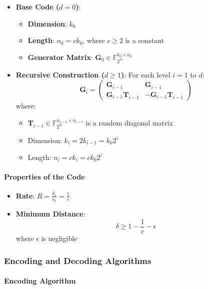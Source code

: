 \documentclass{article}
\theoremstyle{plain}
\theoremstyle{definition}
\theoremstyle{remark}
\theoremstyle{problem}
\begin{document}
\begin{itemize}
    \item \textbf{Base Code ($d = 0$)}:
    \begin{itemize}
        \item \textbf{Dimension}: $k_0$
        \item \textbf{Length}: $n_0 = c k_0$, where $c \geq 2$ is a constant
        \item \textbf{Generator Matrix}: $\mathbf{G}_0 \in \mathbb{F}_{2^m}^{k_0 \times n_0}$
    \end{itemize}

    \item \textbf{Recursive Construction ($d \geq 1$)}:
    For each level $i = 1$ to $d$:
    \[
    \mathbf{G}_i = \begin{pmatrix}
    \mathbf{G}_{i-1} & \mathbf{G}_{i-1} \\
    \mathbf{G}_{i-1} \mathbf{T}_{i-1} & -\mathbf{G}_{i-1} \mathbf{T}_{i-1}
    \end{pmatrix}
    \]
    where:
    \begin{itemize}
        \item $\mathbf{T}_{i-1} \in \mathbb{F}_{2^m}^{n_{i-1} \times n_{i-1}}$ is a random diagonal matrix
        \item Dimension: $k_i = 2 k_{i-1} = k_0 2^i$
        \item Length: $n_i = c k_i = c k_0 2^i$
    \end{itemize}
\end{itemize}

\paragraph{Properties of the Code}

\begin{itemize}
    \item \textbf{Rate}: $R = \frac{k_i}{n_i} = \frac{1}{c}$
    \item \textbf{Minimum Distance}:
    \[
    \delta \geq 1 - \frac{1}{c} - \epsilon
    \]
    where $\epsilon$ is negligible
\end{itemize}

\subsubsection{Encoding and Decoding Algorithms}

\paragraph{Encoding Algorithm}
\end{document}
